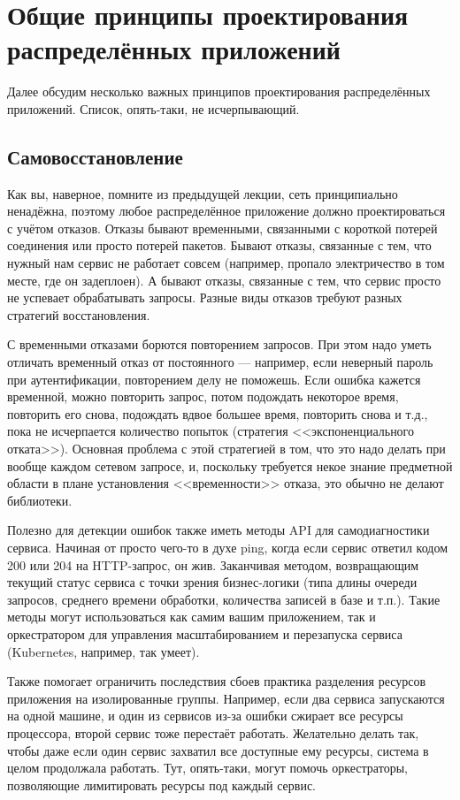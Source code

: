 \documentclass{../../text-style}
\begin{document}
\section{Общие принципы проектирования распределённых приложений}

Далее обсудим несколько важных принципов проектирования распределённых приложений. Список, опять-таки, не исчерпывающий.

\subsection{Самовосстановление}

Как вы, наверное, помните из предыдущей лекции, сеть принципиально ненадёжна, поэтому любое распределённое приложение должно проектироваться с учётом отказов. Отказы бывают временными, связанными с короткой потерей соединения или просто потерей пакетов. Бывают отказы, связанные с тем, что нужный нам сервис не работает совсем (например, пропало электричество в том месте, где он задеплоен). А бывают отказы, связанные с тем, что сервис просто не успевает обрабатывать запросы. Разные виды отказов требуют разных стратегий восстановления.

С временными отказами борются повторением запросов. При этом надо уметь отличать временный отказ от постоянного --- например, если неверный пароль при аутентификации, повторением делу не поможешь. Если ошибка кажется временной, можно повторить запрос, потом подождать некоторое время, повторить его снова, подождать вдвое большее время, повторить снова и т.д., пока не исчерпается количество попыток (стратегия <<экспоненциального отката>>). Основная проблема с этой стратегией в том, что это надо делать при вообще каждом сетевом запросе, и, поскольку требуется некое знание предметной области в плане установления <<временности>> отказа, это обычно не делают библиотеки.

Полезно для детекции ошибок также иметь методы API для самодиагностики сервиса. Начиная от просто чего-то в духе ping, когда если сервис ответил кодом 200 или 204 на HTTP-запрос, он жив. Заканчивая методом, возвращающим текущий статус сервиса с точки зрения бизнес-логики (типа длины очереди запросов, среднего времени обработки, количества записей в базе и т.п.). Такие методы могут использоваться как самим вашим приложением, так и оркестратором для управления масштабированием и перезапуска сервиса (Kubernetes, например, так умеет).

Также помогает ограничить последствия сбоев практика разделения ресурсов приложения на изолированные группы. Например, если два сервиса запускаются на одной машине, и один из сервисов из-за ошибки сжирает все ресурсы процессора, второй сервис тоже перестаёт работать. Желательно делать так, чтобы даже если один сервис захватил все доступные ему ресурсы, система в целом продолжала работать. Тут, опять-таки, могут помочь оркестраторы, позволяющие лимитировать ресурсы под каждый сервис.
\end{document}
